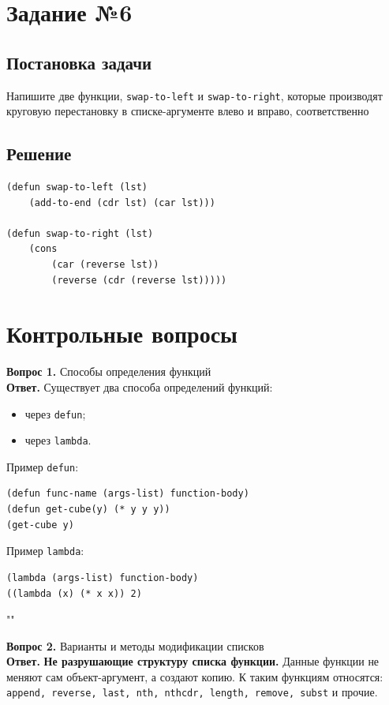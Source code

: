 \documentclass[12pt]{report}
\begin{document}
\section*{Задание №6}
\subsection*{Постановка задачи}
Напишите две функции, \texttt{swap-to-left} и \texttt{swap-to-right}, которые производят круговую перестановку в списке-аргументе влево и вправо, соответственно

\subsection*{Решение}
\begin{lstlisting}
(defun swap-to-left (lst)
	(add-to-end (cdr lst) (car lst)))

(defun swap-to-right (lst)
	(cons
		(car (reverse lst))
		(reverse (cdr (reverse lst)))))
\end{lstlisting}


\section*{Контрольные вопросы}
\textbf{Вопрос 1.} Способы определения функций\\
\indent\textbf{Ответ.} Существует два способа определений функций:

\begin{itemize}
	\item через \texttt{defun};
	\item через \texttt{lambda}.
\end{itemize}

Пример \texttt{defun}:
\begin{lstlisting}
(defun func-name (args-list) function-body)
(defun get-cube(y) (* y y y))
(get-cube y)
\end{lstlisting}

Пример \texttt{lambda}:
\begin{lstlisting}
(lambda (args-list) function-body)
((lambda (x) (* x x)) 2)
\end{lstlisting} ""\newline

\indent \textbf{Вопрос 2.} Варианты и методы модификации списков\\
\indent\textbf{Ответ. }\textbf{Не разрушающие структуру списка функции.} Данные функции не меняют сам объект-аргумент, а создают копию. К таким функциям относятся: 
\texttt{append, reverse, last, nth, nthcdr, length, remove, subst} и прочие.\\
\end{document}
